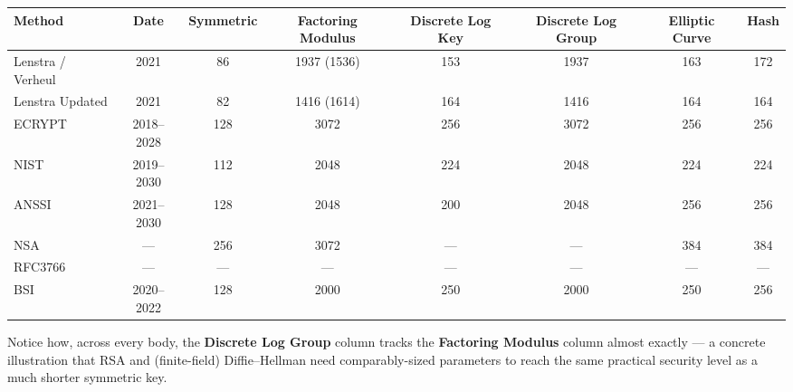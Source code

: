 \documentclass[12pt, a4paper]{article}
\begin{document}
\begin{center}
\small
\begin{tabular}{@{}lccccccc@{}}
\toprule
\textbf{Method} & \textbf{Date} & \textbf{Symmetric} & \textbf{Factoring Modulus} & \textbf{Discrete Log Key} & \textbf{Discrete Log Group} & \textbf{Elliptic Curve} & \textbf{Hash} \\
\midrule
Lenstra / Verheul & 2021 & 86 & 1937 (1536) & 153 & 1937 & 163 & 172 \\
Lenstra Updated & 2021 & 82 & 1416 (1614) & 164 & 1416 & 164 & 164 \\
ECRYPT & 2018--2028 & 128 & 3072 & 256 & 3072 & 256 & 256 \\
NIST & 2019--2030 & 112 & 2048 & 224 & 2048 & 224 & 224 \\
ANSSI & 2021--2030 & 128 & 2048 & 200 & 2048 & 256 & 256 \\
NSA & --- & 256 & 3072 & --- & --- & 384 & 384 \\
RFC3766 & --- & --- & --- & --- & --- & --- & --- \\
BSI & 2020--2022 & 128 & 2000 & 250 & 2000 & 250 & 256 \\
\bottomrule
\end{tabular}
\end{center}
Notice how, across every body, the \textbf{Discrete Log Group} column tracks the \textbf{Factoring Modulus} column almost exactly --- a concrete illustration that RSA and (finite-field) Diffie--Hellman need comparably-sized parameters to reach the same practical security level as a much shorter symmetric key.
\end{document}

